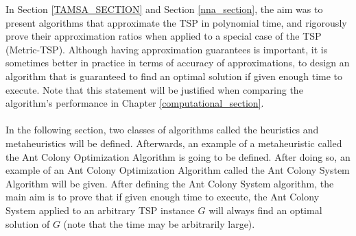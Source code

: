 \documentclass[12pt]{article}
\numberwithin{equation}{subsection}
\numberwithin{table}{subsection}
\numberwithin{algorithm}{subsection}
\numberwithin{figure}{subsection}
\begin{document}
In Section \ref{TAMSA_SECTION} and Section \ref{nna_section}, the aim was to present algorithms that approximate the TSP in polynomial time, and rigorously prove their approximation ratios when applied to a special case of the TSP (Metric-TSP). Although having approximation guarantees is important, it is sometimes better in practice in terms of accuracy of approximations, to design an algorithm that is guaranteed to find an optimal solution if given enough time to execute. Note that this statement will be justified when comparing the algorithm's performance in Chapter \ref{computational_section}. \\\\In the following section, two classes of algorithms called the heuristics and metaheuristics will be defined. Afterwards, an example of a metaheuristic called the Ant Colony Optimization Algorithm is going to be defined. After doing so, an example of an Ant Colony Optimization Algorithm called the Ant Colony System Algorithm will be given. After defining the Ant Colony System algorithm, the main aim is to prove that if given enough time to execute, the Ant Colony System applied to an arbitrary TSP instance $G$ will always find an optimal solution of $G$ (note that the time may be arbitrarily large).
\newpage
{}
\end{document}
